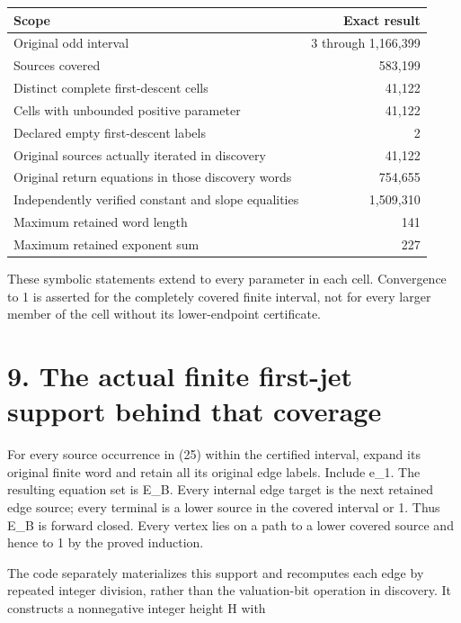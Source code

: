 {\def\LTcaptype{none} %
\begin{longtable}[]{@{}lr@{}}
\toprule\noalign{}
Scope & Exact result \\
\midrule\noalign{}
\endhead
\bottomrule\noalign{}
\endlastfoot
Original odd interval & 3 through 1,166,399 \\
Sources covered & 583,199 \\
Distinct complete first-descent cells & 41,122 \\
Cells with unbounded positive parameter & 41,122 \\
Declared empty first-descent labels & 2 \\
Original sources actually iterated in discovery & 41,122 \\
Original return equations in those discovery words & 754,655 \\
Independently verified constant and slope equalities & 1,509,310 \\
Maximum retained word length & 141 \\
Maximum retained exponent sum & 227 \\
\end{longtable}
}

These symbolic statements extend to every parameter in each cell.
Convergence to 1 is asserted for the completely covered finite interval,
not for every larger member of the cell without its lower-endpoint
certificate.

\section{9. The actual finite first-jet support behind that coverage}

For every source occurrence in (25) within the certified interval,
expand its original finite word and retain all its original edge labels.
Include e\_1. The resulting equation set is E\_B. Every internal edge
target is the next retained edge source; every terminal is a lower
source in the covered interval or 1. Thus E\_B is forward closed. Every
vertex lies on a path to a lower covered source and hence to 1 by the
proved induction.

The code separately materializes this support and recomputes each edge
by repeated integer division, rather than the valuation-bit operation in
discovery. It constructs a nonnegative integer height H with


